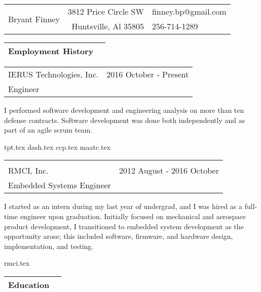 \documentclass[10pt,a4paper]{article}
\begin{document}
\begin{table}
  \noindent\begin{tabularx}{\textwidth}{Xr|l}
    \toprule
    \multirow{2}{*}{\Huge Bryant Finney} & 3812 Price Circle SW & finney.bp@gmail.com \\
                                                  & Huntsville, Al 35805 & 256-714-1289 \\
    \bottomrule
  \end{tabularx}
\end{table}

\noindent\begin{tabularx}{\textwidth}{Xr}
  \Large Employment History & \\
  \bottomrule
\end{tabularx}
\smallskip

\noindent\begin{tabularx}{\textwidth}{Xr}
  IERUS Technologies, Inc. & 2016 October - Present \\
  Engineer & \\
\end{tabularx}
\smallskip

I performed software development and engineering analysis on more than ten defense
contracts. Software development was done both independently and as part of an agile
scrum team.

\bigskip

{tpt.tex}
{dash.tex}
{ccp.tex}
{maatc.tex}

\noindent\begin{tabularx}{\textwidth}{Xr}
  \Large \\ \bottomrule \\
  RMCI, Inc. & 2012 August - 2016 October \\
  Embedded Systems Engineer & \\
\end{tabularx}
\smallskip

I started as an intern during my last year of undergrad, and I was hired as a full-time
engineer upon graduation. Initially focused on mechanical and aerospace product
development, I transitioned to embedded system development as the opportunity arose; this
included software, firmware, and hardware design, implementation, and testing.

\bigskip

{rmci.tex}

\noindent\begin{tabularx}{\textwidth}{Xr}
  \Large Education & \\
  \bottomrule
\end{tabularx}
\smallskip
\end{document}
